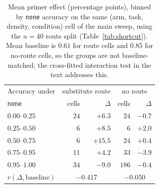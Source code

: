 \documentclass[11pt]{article}
\begin{document}
\begin{table}[H]
\centering
\small
\setlength{\tabcolsep}{4pt}
\begin{tabular}{lrrrr}
\toprule
Accuracy under & \multicolumn{2}{c}{substitute route} & \multicolumn{2}{c}{no route} \\
\cmidrule(lr){2-3}\cmidrule(lr){4-5}
\texttt{none} & cells & $\Delta$ & cells & $\Delta$ \\
\midrule
$0.00$--$0.25$ & $24$ & $+6.3$  & $24$  & $-0.7$ \\
$0.25$--$0.50$ & $6$  & $+8.5$  & $6$   & $+2.0$ \\
$0.50$--$0.75$ & $6$  & $+15.5$ & $24$  & $+0.4$ \\
$0.75$--$0.95$ & $11$ & $+4.2$  & $33$  & $-3.9$ \\
$0.95$--$1.00$ & $34$ & $-9.0$  & $186$ & $-0.4$ \\
\midrule
$r(\Delta,\mathrm{baseline})$ & \multicolumn{2}{c}{$-0.417$} & \multicolumn{2}{c}{$-0.050$} \\
\bottomrule
\end{tabular}
\caption{Mean primer effect (percentage points), binned by \texttt{none}
accuracy on the same (arm, task, density, condition) cell of the main
sweep, using the $n{=}40$ route split (Table~\ref{tab:shortcut}).
Mean baseline is $0.61$ for route cells and $0.85$ for no-route cells, so
the groups are not baseline-matched; the cross-fitted interaction test in
the text addresses this.}
\label{tab:baseline}
\end{table}

\begin{table}[H]
\centering
\footnotesize
\setlength{\tabcolsep}{2.5pt}
\caption{Route $\times$ baseline relation, main sweep plus high-density
extension (screened: published split and probe). ``Both'' counts each cell
once per fold direction; $k$ for the window rows counts points. Interaction
CIs resample (arm, task, density) blocks, or (arm, task) for screened
arms.}
\label{tab:robust}
\end{table}
\end{document}

